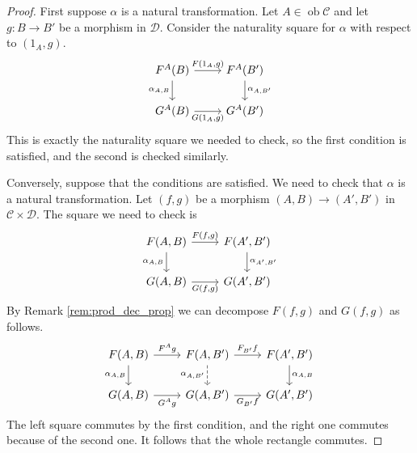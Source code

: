 \documentclass{report}
\DeclareMathOperator{\ob}{ob}
\theoremstyle{definition}
\theoremstyle{plain}
\theoremstyle{definition}
\begin{document}
		\begin{proof}
			First suppose $\alpha$ is a natural transformation. Let $A\in\ob\mathcal{C}$ and let $g\colon B \to B'$ be a morphism in $\mathcal{D}$. Consider the naturality square for $\alpha$ with respect to $(1_A,g)$.
			\[\begin{tikzcd}
				{F^A(B)} & {F^A(B')} \\
				{G^A(B)} & {G^A(B')}
				\arrow["{F(1_A,g)}", from=1-1, to=1-2]
				\arrow["{G(1_A,g)}"', from=2-1, to=2-2]
				\arrow["{\alpha_{A,B}}"', from=1-1, to=2-1]
				\arrow["{\alpha_{A,B'}}", from=1-2, to=2-2]
			\end{tikzcd}\]
			This is exactly the naturality square we needed to check, so the first condition is satisfied, and the second is checked similarly.
			
			Conversely, suppose that the conditions are satisfied. We need to check that $\alpha$ is a natural transformation. Let $(f,g)$ be a morphism $(A,B)\to(A',B')$ in $\mathcal{C}\times \mathcal{D}$. The square we need to check is
			\[\begin{tikzcd}
				{F(A,B)} & {F(A',B')} \\
				{G(A,B)} & {G(A',B')}
				\arrow["{F(f,g)}", from=1-1, to=1-2]
				\arrow["{G(f,g)}"', from=2-1, to=2-2]
				\arrow["{\alpha_{A,B}}"', from=1-1, to=2-1]
				\arrow["{\alpha_{A',B'}}", from=1-2, to=2-2]
			\end{tikzcd}\]
			By Remark \ref{rem:prod_dec_prop} we can decompose $F(f,g)$ and $G(f,g)$ as follows.
			\[\begin{tikzcd}
				{F(A,B)} & {F(A,B')} & {F(A',B')} \\
				{G(A,B)} & {G(A,B')} & {G(A',B')}
				\arrow["{\alpha_{A,B}}"', from=1-1, to=2-1]
				\arrow["{\alpha_{A,B}}", from=1-3, to=2-3]
				\arrow["{\alpha_{A,B'}}"', dashed, from=1-2, to=2-2]
				\arrow["{G^Ag}"', from=2-1, to=2-2]
				\arrow["{G_{B'}f}"', from=2-2, to=2-3]
				\arrow["{F^Ag}", from=1-1, to=1-2]
				\arrow["{F_{B'}f}", from=1-2, to=1-3]
			\end{tikzcd}\]
			The left square commutes by the first condition, and the right one commutes because of the second one. It follows that the whole rectangle commutes.
		\end{proof}
\end{document}

